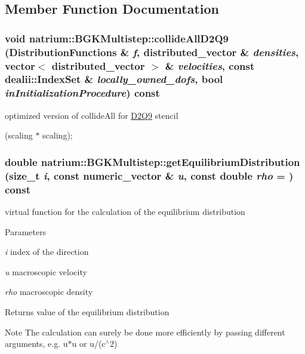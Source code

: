 \subsection{Member Function Documentation}
\hypertarget{classnatrium_1_1BGKMultistep_abc9c762511c5dd75a4fc238584a0bc0a}{
\subsubsection[{collideAllD2Q9}]{\setlength{\rightskip}{0pt plus 5cm}void natrium::BGKMultistep::collideAllD2Q9 ({\bf DistributionFunctions} \& {\em f}, \/  {\bf distributed\_\-vector} \& {\em densities}, \/  vector$<$ {\bf distributed\_\-vector} $>$ \& {\em velocities}, \/  const dealii::IndexSet \& {\em locally\_\-owned\_\-dofs}, \/  bool {\em inInitializationProcedure}) const}}
\label{classnatrium_1_1BGKMultistep_abc9c762511c5dd75a4fc238584a0bc0a}


optimized version of collideAll for \hyperlink{classnatrium_1_1D2Q9}{D2Q9} stencil 

(scaling $\ast$ scaling); \hypertarget{classnatrium_1_1BGKMultistep_a034cd475974bcce0db64e52245efd91d}{
\subsubsection[{getEquilibriumDistribution}]{\setlength{\rightskip}{0pt plus 5cm}double natrium::BGKMultistep::getEquilibriumDistribution (size\_\-t {\em i}, \/  const {\bf numeric\_\-vector} \& {\em u}, \/  const double {\em rho} = {}) const}}
\label{classnatrium_1_1BGKMultistep_a034cd475974bcce0db64e52245efd91d}


virtual function for the calculation of the equilibrium distribution 
\begin{DoxyParams}{Parameters}
\item[{\em i}]index of the direction \item[{\em u}]macroscopic velocity \item[{\em rho}]macroscopic density \end{DoxyParams}
\begin{DoxyReturn}{Returns}
value of the equilibrium distribution 
\end{DoxyReturn}
\begin{DoxyNote}{Note}
The calculation can surely be done more efficiently by passing different arguments, e.g. u$\ast$u or u/(c$^\wedge$2) 
\end{DoxyNote}


